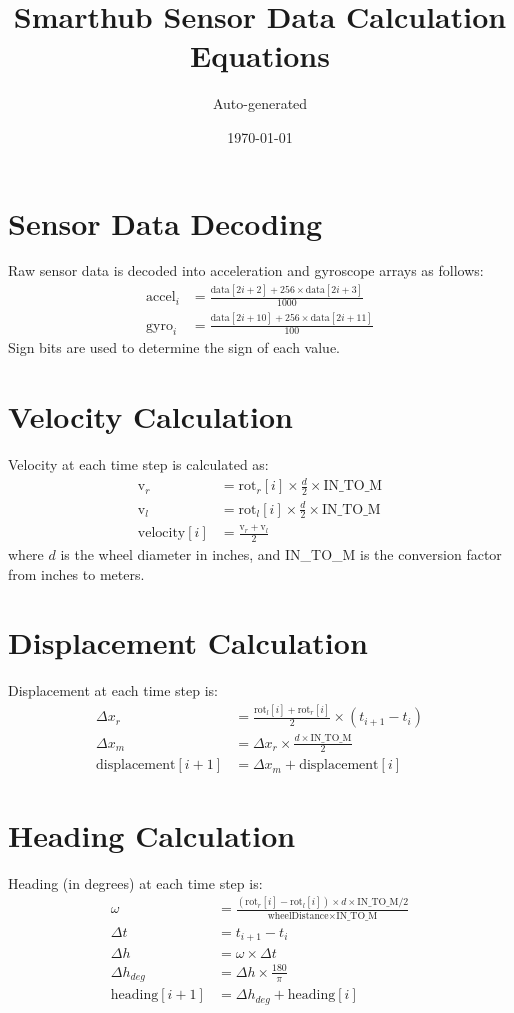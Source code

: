 \documentclass{article}
\title{Smarthub Sensor Data Calculation Equations}
\author{Auto-generated}
\date{\today}
\begin{document}
\maketitle

\section*{Sensor Data Decoding}
Raw sensor data is decoded into acceleration and gyroscope arrays as follows:
\begin{align*}
\text{accel}_i &= \frac{\text{data}[2i+2] + 256 \times \text{data}[2i+3]}{1000} \\
\text{gyro}_i  &= \frac{\text{data}[2i+10] + 256 \times \text{data}[2i+11]}{100}
\end{align*}
Sign bits are used to determine the sign of each value.

\section*{Velocity Calculation}
Velocity at each time step is calculated as:
\begin{align*}
\text{v}_r &= \text{rot}_r[i] \times \frac{d}{2} \times \text{IN\_TO\_M} \\
\text{v}_l &= \text{rot}_l[i] \times \frac{d}{2} \times \text{IN\_TO\_M} \\
\text{velocity}[i] &= \frac{\text{v}_r + \text{v}_l}{2}
\end{align*}
where $d$ is the wheel diameter in inches, and IN\_TO\_M is the conversion factor from inches to meters.

\section*{Displacement Calculation}
Displacement at each time step is:
\begin{align*}
\Delta x_r &= \frac{\text{rot}_l[i] + \text{rot}_r[i]}{2} \times (t_{i+1} - t_i) \\
\Delta x_m &= \Delta x_r \times \frac{d \times \text{IN\_TO\_M}}{2} \\
\text{displacement}[i+1] &= \Delta x_m + \text{displacement}[i]
\end{align*}

\section*{Heading Calculation}
Heading (in degrees) at each time step is:
\begin{align*}
\omega &= \frac{(\text{rot}_r[i] - \text{rot}_l[i]) \times d \times \text{IN\_TO\_M} / 2}{\text{wheelDistance} \times \text{IN\_TO\_M}} \\
\Delta t &= t_{i+1} - t_i \\
\Delta h &= \omega \times \Delta t \\
\Delta h_{deg} &= \Delta h \times \frac{180}{\pi} \\
\text{heading}[i+1] &= \Delta h_{deg} + \text{heading}[i]
\end{align*}
\end{document}
